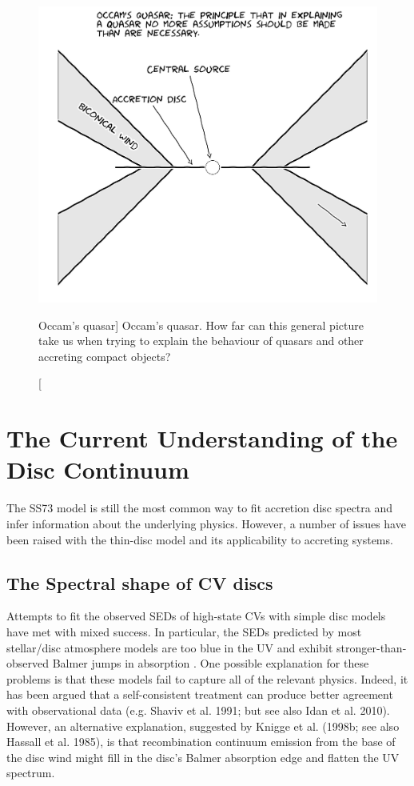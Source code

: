 \begin{figure}
\centering
\includegraphics[width=1.0\textwidth]{figures/01-intro/occam.jpg}
\caption
[Occam's quasar]
{
Occam's quasar. How far can this general picture take us when trying to explain
the behaviour of quasars and other accreting compact objects?
} 
\label{fig:occam}
\end{figure}


\section{The Current Understanding of the Disc Continuum}

\label{sec:disc_continuum}

The SS73 model is still the most common way to fit accretion disc spectra and infer
information about the underlying physics. However, 
a number of issues have been raised with the thin-disc model and
its applicability to accreting systems. 

\subsection{The Spectral shape of CV discs}

Attempts to fit the observed SEDs of high-state CVs with simple disc models 
have met with mixed success. In
particular, the SEDs predicted by most stellar/disc atmosphere models 
are too blue in the UV \citep{wade1988,long1991,long1994,knigge1998} and exhibit
stronger-than-observed Balmer jumps in absorption 
\citep{wade1984,haug1987,ladous1989b,knigge1998}. One possible
explanation for these problems is that these models fail to capture
all of the relevant physics. Indeed, it has been argued that a
self-consistent treatment can produce better agreement with 
observational data (e.g. Shaviv et al. 1991;  but see also Idan et al. 2010).
\nocite{idanshaviv2010} \nocite{shaviv1991}
However, an alternative explanation, suggested by Knigge et al.
(1998b; see also Hassall et al. 1985)\nocite{KLWB98,hassall}, 
is that recombination continuum emission from the base of the 
disc wind might fill in the disc's Balmer absorption edge and flatten 
the UV spectrum.

